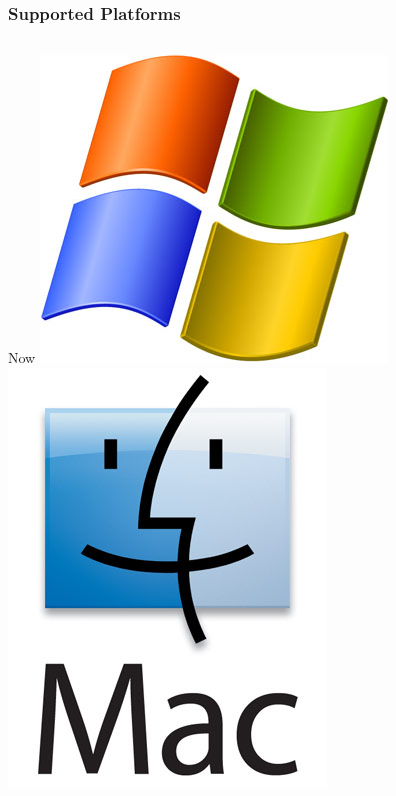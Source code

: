 \documentclass[12pt]{beamer}
\begin{document}
\begin{frame}
\frametitle{Supported Platforms}
\begin{columns}
  \begin{block}{Now}
  \centering
  \includegraphics[height=0.2\textheight]{img/windows} \\
  \includegraphics[height=0.2\textheight]{img/mac} \\

\end{block}
\end{columns}
\end{frame}
\end{document}
